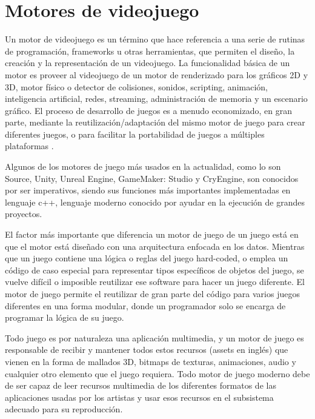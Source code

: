 
\section{Motores de videojuego}  %

\ifpdf
    \graphicspath{{motorJuego/Figs/Raster/}{motorJuego/Figs/PDF/}{motorJuego/Figs/}}
\else
    \graphicspath{{motorJuego/Figs/Vector/}{motorJuego/Figs/}}
\fi

Un motor de videojuego es un término que hace referencia a una serie de rutinas de programación, frameworks u otras herramientas, que permiten el diseño, la creación y la representación de un videojuego. La funcionalidad básica de un motor es proveer al videojuego de un motor de renderizado para los gráficos 2D y 3D, motor físico o detector de colisiones, sonidos, scripting, animación, inteligencia artificial, redes, streaming, administración de memoria y un escenario gráfico. El proceso de desarrollo de juegos es a menudo economizado, en gran parte, mediante la reutilización/adaptación del mismo motor de juego para crear diferentes juegos, o para facilitar la portabilidad de juegos a múltiples plataformas \cite{JasonGregory-GameEngineArchitecture}.

Algunos de los motores de juego más usados en la actualidad, como lo son Source, Unity, Unreal Engine, GameMaker: Studio y CryEngine, son conocidos por ser imperativos, siendo sus funciones más importantes implementadas en lenguaje c++, lenguaje moderno conocido por ayudar en la ejecución de grandes proyectos.

El factor más importante que diferencia un motor de juego de un juego está en que el motor está diseñado con una arquitectura enfocada en los datos. Mientras que un juego contiene una lógica o reglas del juego hard-coded, o emplea un código de caso especial para representar tipos específicos de objetos del juego, se vuelve difícil o imposible reutilizar ese software para hacer un juego diferente. El motor de juego permite el reutilizar de gran parte del código para varios juegos diferentes en una forma modular, donde un programador solo se encarga de programar la lógica de su juego.

Todo juego es por naturaleza una aplicación multimedia, y un motor de juego es responsable de recibir y mantener todos estos recursos (assets en inglés) que vienen en la forma de mallados 3D, bitmaps de texturas, animaciones, audio y cualquier otro elemento que el juego requiera. Todo motor de juego moderno debe de ser capaz de leer recursos multimedia de los diferentes formatos de las aplicaciones usadas por los artistas y usar esos recursos en el subsistema adecuado para su reproducción.

